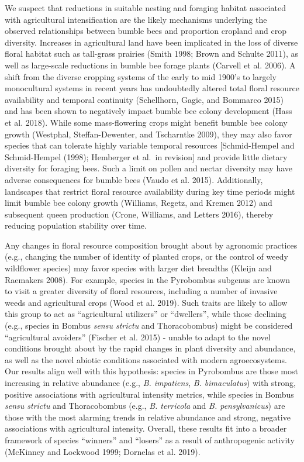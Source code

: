\documentclass[11pt,]{article}
\begin{document}
We suspect that reductions in suitable nesting and foraging habitat
associated with agricultural intensification are the likely mechanisms
underlying the observed relationships between bumble bees and proportion
cropland and crop diversity. Increases in agricultural land have been
implicated in the loss of diverse floral habitat such as tall-grass
prairies (Smith 1998; Brown and Schulte 2011), as well as large-scale
reductions in bumble bee forage plants (Carvell et al. 2006). A shift
from the diverse cropping systems of the early to mid 1900's to largely
monocultural systems in recent years has undoubtedly altered total
floral resource availability and temporal continuity (Schellhorn, Gagic,
and Bommarco 2015) and has been shown to negatively impact bumble bee
colony development (Hass et al. 2018). While some mass-flowering crops
might benefit bumble bee colony growth (Westphal, Steffan-Dewenter, and
Tscharntke 2009), they may also favor species that can tolerate highly
variable temporal resources {[}Schmid-Hempel and Schmid-Hempel (1998);
Hemberger et al.~in revision{]} and provide little dietary diversity for
foraging bees. Such a limit on pollen and nectar diversity may have
adverse consequences for bumble bees (Vaudo et al. 2015). Additionally,
landscapes that restrict floral resource availability during key time
periods might limit bumble bee colony growth (Williams, Regetz, and
Kremen 2012) and subsequent queen production (Crone, Williams, and
Letters 2016), thereby reducing population stability over time.

Any changes in floral resource composition brought about by agronomic
practices (e.g., changing the number of identity of planted crops, or
the control of weedy wildflower species) may favor species with larger
diet breadths (Kleijn and Raemakers 2008). For example, species in the
Pyrobombus subgenus are known to visit a greater diversity of floral
resources, including a number of invasive weeds and agricultural crops
(Wood et al. 2019). Such traits are likely to allow this group to act as
``agricultural utilizers'' or ``dwellers'', while those declining (e.g.,
species in Bombus \emph{sensu strictu} and Thoracobombus) might be
considered ``agricultural avoiders'' (Fischer et al. 2015) - unable to
adapt to the novel conditions brought about by the rapid changes in
plant diversity and abundance, as well as the novel abiotic conditions
associated with modern agroecosystems. Our results align well with this
hypothesis: species in Pyrobombus are those most increasing in relative
abundance (e.g., \emph{B. impatiens}, \emph{B. bimaculatus}) with
strong, positive associations with agricultural intensity metrics, while
species in Bombus \emph{sensu strictu} and Thoracobombus (e.g., \emph{B.
terricola} and \emph{B. pensylvanicus}) are those with the most alarming
trends in relative abundance and strong, negative associations with
agricultural intensity. Overall, these results fit into a broader
framework of species ``winners'' and ``losers'' as a result of
anthropogenic activity (McKinney and Lockwood 1999; Dornelas et al.
2019).
\end{document}
